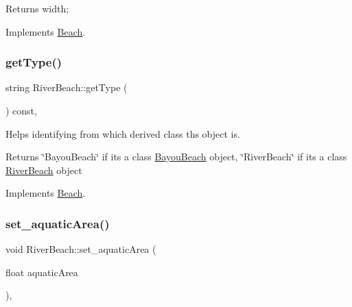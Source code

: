 \begin{DoxyReturn}{Returns}
width; 
\end{DoxyReturn}


Implements \hyperlink{class_beach_af28e3603ea98766d94c9e8eb9f76d509}{Beach}.

\mbox{\label{class_river_beach_a07f48c077de96aca001f47ce06253f2f}} 
\subsubsection{\texorpdfstring{get\+Type()}{getType()}}
{\footnotesize\ttfamily string River\+Beach\+::get\+Type (\begin{DoxyParamCaption}{ }\end{DoxyParamCaption}) const\hspace{0.3cm}{\ttfamily [inline]}, {\ttfamily [virtual]}}



Helps identifying from which derived class ths object is. 

\begin{DoxyReturn}{Returns}
\char`\"{}\+Bayou\+Beach\char`\"{} if it\textquotesingle{}s a class \hyperlink{class_bayou_beach}{Bayou\+Beach} object, \char`\"{}\+River\+Beach\char`\"{} if it\textquotesingle{}s a class \hyperlink{class_river_beach}{River\+Beach} object 
\end{DoxyReturn}


Implements \hyperlink{class_beach_a30001df535b2456e47611c7a0705660b}{Beach}.

\mbox{\label{class_river_beach_ac236cb64cc422eea722bb99fdb29d4d0}} 
\subsubsection{\texorpdfstring{set\+\_\+aquatic\+Area()}{set\_aquaticArea()}}
{\footnotesize\ttfamily void River\+Beach\+::set\+\_\+aquatic\+Area (\begin{DoxyParamCaption}\item[{float}]{aquatic\+Area }\end{DoxyParamCaption})\hspace{0.3cm}{\ttfamily [inline]}, {\ttfamily [virtual]}}



